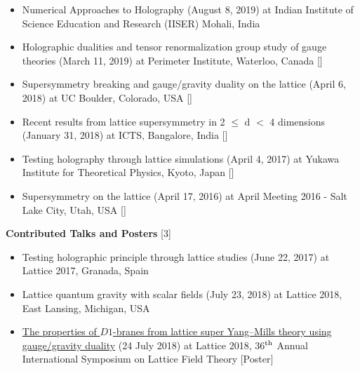 \begin{itemize}
 \item Numerical Approaches to Holography (August 8, 2019) at Indian Institute of Science Education and Research (IISER) Mohali, India \vspace{1mm} 
 
  \item Holographic dualities and tensor renormalization group study of gauge theories (March 11, 2019) at Perimeter Institute, Waterloo, Canada 
 [] 
\vspace{1mm} 


  \item Supersymmetry breaking and gauge/gravity duality on the lattice (April 6, 2018) at UC Boulder, Colorado, USA 
    [] 
  \vspace{1mm} 
  
  
  \item Recent results from lattice supersymmetry in 2 $\le$ d $<$ 4 dimensions (January 31, 2018) at ICTS, Bangalore, India 
   [] 
  \vspace{1mm} 
  
 \item Testing holography through lattice simulations (April 4, 2017) at Yukawa Institute for Theoretical Physics, Kyoto, Japan
  []  
 \vspace{1mm} 
 
 
\item Supersymmetry on the lattice (April 17, 2016) at April Meeting 2016 - Salt Lake City, Utah, USA 
 [] 
\end{itemize}



\textcolor{alizarin}{\textbf{\fontsize{10}{38} \bfseries Contributed Talks and Posters} [3]}
\begin{itemize}
  \item Testing holographic principle through lattice studies (June 22, 2017) at Lattice 2017, Granada, Spain \vspace{1mm} 
  \item Lattice quantum gravity with scalar fields (July 23, 2018) at Lattice 2018, East Lansing, Michigan, USA   
  \item \href{https://indico.fnal.gov/event/15949/session/4/contribution/66}{The properties of $D1$-branes from lattice super Yang--Mills theory using gauge/gravity duality} (24 July 2018) 
 at Lattice 2018, 36$^{\rm{th}}$ Annual International Symposium on Lattice Field Theory [Poster] 
\end{itemize}
 
